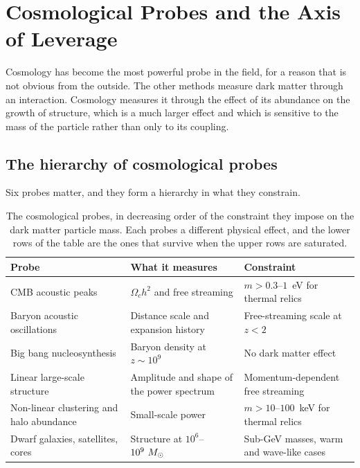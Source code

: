 
\chapter{Cosmological Probes and the Axis of Leverage}
\label{ch:cosmoprobes}

Cosmology has become the most powerful probe in the field, for a reason that
is not obvious from the outside. The other methods measure dark matter
through an interaction. Cosmology measures it through the effect of its
abundance on the growth of structure, which is a much larger effect and which
is sensitive to the mass of the particle rather than only to its coupling.

\section{The hierarchy of cosmological probes}Six probes matter, and they form a
hierarchy in what they constrain.

\begin{table}[H]
\centering
\caption{The cosmological probes, in decreasing order of the constraint they
impose on the dark matter particle mass. Each probes a different physical
effect, and the lower rows of the table are the ones that survive when the
upper rows are saturated.}
\label{tab:cosmoprobes}
\begin{tabular}{@{}>{\RaggedRight\arraybackslash}p{}p{}p{}@{}}
\toprule
\textbf{Probe} & \textbf{What it measures} & \textbf{Constraint} \\
\midrule
CMB acoustic peaks & $\Omega_c h^2$ and free streaming & $m > 0.3$--$1$~eV for thermal relics \\
Baryon acoustic oscillations & Distance scale and expansion history & Free-streaming scale at $z<2$ \\
Big bang nucleosynthesis & Baryon density at $z\sim 10^{9}$ & No dark matter effect \\
Linear large-scale structure & Amplitude and shape of the power spectrum & Momentum-dependent free streaming \\
Non-linear clustering and halo abundance & Small-scale power & $m > 10$--$100$~keV for thermal relics \\
Dwarf galaxies, satellites, cores & Structure at $10^{6}$--$10^{9}\ M_{\odot}$ & Sub-GeV masses, warm and wave-like cases \\
\bottomrule
\end{tabular}
\end{table}

